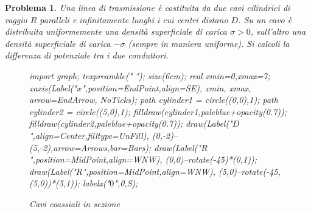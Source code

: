 \documentclass[b5paper,twoside]{book}
\newtheorem{problema}{Problema}
\let\oldhat\hat
\renewcommand{\vec}[1]{\mathbf{#1}}
\renewcommand{\hat}[1]{\widehat{\mathbf{#1}}}
\begin{document}
\begin{problema}
	Una linea di trasmissione è costituita da due cavi cilindrici	 di raggio $R$ paralleli
	e infinitamente lunghi i cui centri distano $D$. Su un cavo è distribuita uniformemente
	una densità superficiale di carica $\sigma > 0$, sull'altro una densità superficiale di 
	carica $-\sigma$ (sempre in maniera uniforme). Si calcoli la differenza di potenziale tra
	i due conduttori.
	\begin{figure}[H]
		\centering
		\begin{asy}
			import graph;
			texpreamble("\let\oldhat\hat
			\renewcommand{\vec}[1]{\mathbf{#1}}
			\renewcommand{\hat}[1]{\oldhat{\mathbf{#1}}}");
			size(6cm);
			real xmin=0,xmax=7;
			xaxis(Label("\small $x$",position=EndPoint,align=SE),
			xmin, xmax, arrow=EndArrow, NoTicks);
			path cylinder1 = circle((0,0),1);
			path cylinder2 = circle((5,0),1);
			filldraw(cylinder1,paleblue+opacity(0.7));
			filldraw(cylinder2,paleblue+opacity(0.7));
			draw(Label("\small $D$",align=Center,filltype=UnFill),
			(0,-2)--(5,-2),arrow=Arrows,bar=Bars);
			draw(Label("\small $R$",position=MidPoint,align=WNW),
			(0,0)--rotate(-45)*(0,1));
			draw(Label("\small $R$",position=MidPoint,align=WNW),
			(5,0)--rotate(-45,(5,0))*(5,1));
			labelx("\small $0$",0,S);
		\end{asy}
		\caption{Cavi coassiali in sezione}
		\label{fig:cavi_coassiali_sezione}
	\end{figure}
\end{problema}
\end{document}
